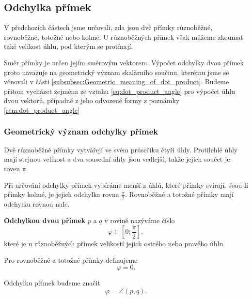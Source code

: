 \subsection{Odchylka přímek}
\label{subsec:Angle_between_lines}

V předchozích částech jsme určovali, zda jsou dvě přímky různoběžné,
rovnoběžné, totožné nebo kolmé. U různoběžných přímek však můžeme
zkoumat také velikost úhlu, pod kterým se protínají.

Směr přímky je určen jejím směrovým vektorem. Výpočet odchylky dvou
přímek proto navazuje na geometrický význam skalárního součinu,
kterému jsme se věnovali v části
\ref{subsubsec:Geometric_meaning_of_dot_product}. Budeme přitom
vycházet zejména ze vztahu \eqref{eq:dot_product_angle} pro výpočet
úhlu dvou vektorů, případně z jeho odvozené formy z poznámky \ref{rem:dot_product_angle}


\subsubsection{Geometrický význam odchylky přímek}
\label{subsubsec:Geometric_meaning_angle_lines}

Dvě různoběžné přímky vytvářejí ve svém průsečíku čtyři úhly.
Protilehlé úhly mají stejnou velikost a dva sousední úhly jsou
vedlejší, takže jejich součet je roven $\pi$.

Při určování odchylky přímek vybíráme menší z úhlů, které přímky
svírají. Jsou-li přímky kolmé, je jejich odchylka rovna
$\frac{\pi}{2}$. Rovnoběžné a totožné přímky mají odchylku rovnou
nule.

\begin{definition}\label{def:Angle_between_lines}
    \textbf{Odchylkou dvou přímek} $p$ a $q$ v rovině nazýváme číslo
    \[
        \varphi\in\left[0;\frac{\pi}{2}\right],
    \]
    které je u různoběžných přímek velikostí jejich ostrého nebo
    pravého úhlu.

    Pro rovnoběžné a totožné přímky definujeme
    \[
        \varphi=0.
    \]
\end{definition}

Odchylku přímek budeme značit
\[
    \varphi=\angle(p,q).
\]

